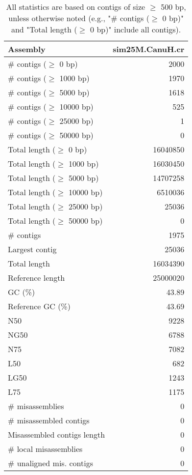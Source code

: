 \documentclass[12pt,a4paper]{article}
\begin{document}
\begin{table}[ht]
\begin{center}
\caption{All statistics are based on contigs of size $\geq$ 500 bp, unless otherwise noted (e.g., "\# contigs ($\geq$ 0 bp)" and "Total length ($\geq$ 0 bp)" include all contigs).}
\begin{tabular}{|l*{1}{|r}|}
\hline
Assembly & sim25M.CanuH.cr \\ \hline
\# contigs ($\geq$ 0 bp) & 2000 \\ \hline
\# contigs ($\geq$ 1000 bp) & 1970 \\ \hline
\# contigs ($\geq$ 5000 bp) & 1618 \\ \hline
\# contigs ($\geq$ 10000 bp) & 525 \\ \hline
\# contigs ($\geq$ 25000 bp) & 1 \\ \hline
\# contigs ($\geq$ 50000 bp) & 0 \\ \hline
Total length ($\geq$ 0 bp) & 16040850 \\ \hline
Total length ($\geq$ 1000 bp) & 16030450 \\ \hline
Total length ($\geq$ 5000 bp) & 14707258 \\ \hline
Total length ($\geq$ 10000 bp) & 6510036 \\ \hline
Total length ($\geq$ 25000 bp) & 25036 \\ \hline
Total length ($\geq$ 50000 bp) & 0 \\ \hline
\# contigs & 1975 \\ \hline
Largest contig & 25036 \\ \hline
Total length & 16034390 \\ \hline
Reference length & 25000020 \\ \hline
GC (\%) & 43.89 \\ \hline
Reference GC (\%) & 43.69 \\ \hline
N50 & 9228 \\ \hline
NG50 & 6788 \\ \hline
N75 & 7082 \\ \hline
L50 & 682 \\ \hline
LG50 & 1243 \\ \hline
L75 & 1175 \\ \hline
\# misassemblies & 0 \\ \hline
\# misassembled contigs & 0 \\ \hline
Misassembled contigs length & 0 \\ \hline
\# local misassemblies & 0 \\ \hline
\# unaligned mis. contigs & 0 \\ \hline

\end{tabular}
\end{center}
\end{table}
\end{document}
